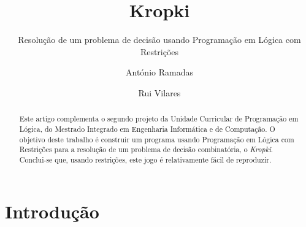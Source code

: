 \documentclass[runningheads,a4paper]{llncs}
\begin{document}
\mainmatter  %

\title{Kropki}

\subtitle{Resolução de um problema de decisão usando Programação em Lógica com Restrições}

%
%
\author{António Ramadas\and Rui Vilares}
%


%
%

\maketitle


\begin{abstract}

Este artigo complementa o segundo projeto da Unidade Curricular de Programação em Lógica, do Mestrado Integrado em Engenharia Informática e de Computação. O objetivo deste trabalho é construir um programa usando Programação em Lógica com Restrições para a resolução de um problema de decisão combinatória, o \textit{Kropki}. Conclui-se que, usando restrições, este jogo é relativamente fácil de reproduzir.


\end{abstract}


\section{Introdução}
\end{document}
